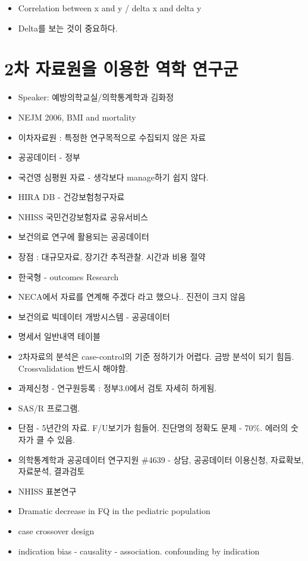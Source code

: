 \documentclass[]{book}
\providecommand{\tightlist}{%
  \setlength{\itemsep}{0pt}\setlength{\parskip}{0pt}}
\begin{document}
\begin{itemize}
  \begin{itemize}
  \tightlist
  \item
    Correlation between x and y / delta x and delta y
  \item
    Delta를 보는 것이 중요하다.
  \end{itemize}
\end{itemize}

\section{2차 자료원을 이용한 역학 연구군}\label{----}

\begin{itemize}
\tightlist
\item
  Speaker: 예방의학교실/의학통계학과 김화정
\item
  NEJM 2006, BMI and mortality
\item
  이차자료원 : 특정한 연구목적으로 수집되지 않은 자료
\item
  공공데이터 - 정부
\item
  국건영 심평원 자료 - 생각보다 manage하기 쉽지 않다.
\item
  HIRA DB - 건강보험청구자료
\item
  NHISS 국민건강보험자료 공유서비스
\item
  보건의료 연구에 활용되는 공공데이터
\item
  장점 : 대규모자료, 장기간 추적관찰. 시간과 비용 절약
\item
  한국형 - outcomes Research
\item
  NECA에서 자료를 연계해 주겠다 라고 했으나.. 진전이 크지 않음
\item
  보건의료 빅데이터 개방시스템 - 공공데이터
\item
  명세서 일반내역 테이블
\item
  2차자료의 분석은 case-control의 기준 정하기가 어렵다. 금방 분석이 되기
  힘듬. Crossvalidation 반드시 해야함.
\item
  과제신청 - 연구원등록 : 정부3.0에서 검토 자세히 하게됨.
\item
  SAS/R 프로그램.
\item
  단점 - 5년간의 자료. F/U보기가 힘들어. 진단명의 정확도 문제 - 70\%.
  에러의 숫자가 클 수 있음.
\item
  의학통계학과 공공데이터 연구지원 \#4639 - 상담, 공공데이터 이용신청,
  자료확보, 자료분석, 결과검토
\item
  NHISS 표본연구
\item
  Dramatic decrease in FQ in the pediatric population
\item
  case crossover design
\item
  indication bias - causality - association. confounding by indication
\end{itemize}
\end{document}
